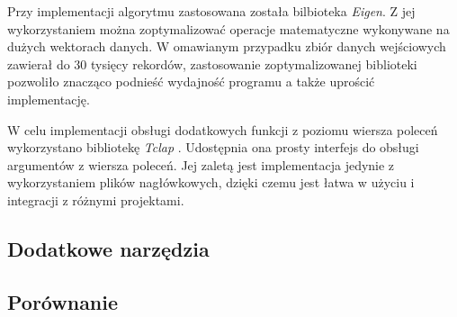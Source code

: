 Przy implementacji algorytmu zastosowana została bilbioteka \textit{Eigen}\cite{eigen}. Z jej wykorzystaniem można zoptymalizować operacje matematyczne wykonywane na dużych wektorach danych. W omawianym przypadku zbiór danych wejściowych zawierał do 30 tysięcy rekordów, zastosowanie zoptymalizowanej biblioteki pozwoliło znacząco podnieść wydajność programu a także uprościć implementację.

W celu implementacji obsługi dodatkowych funkcji z poziomu wiersza poleceń wykorzystano bibliotekę \textit{Tclap} \cite{tclap}. Udostępnia ona prosty interfejs do obsługi argumentów z wiersza poleceń. Jej zaletą jest implementacja jedynie z wykorzystaniem plików nagłówkowych, dzięki czemu jest łatwa w użyciu i integracji z różnymi projektami.

\subsection{Dodatkowe narzędzia}
\label{subsec_narzedzia}


\subsection{Porównanie}
\label{subsec_porownanie}
